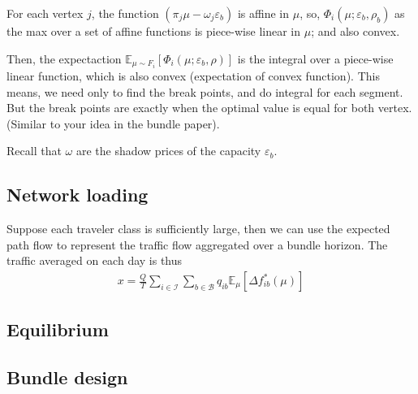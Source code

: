 \documentclass{article}
\newcommand{\setB}{\mathcal{B}}
\newcommand{\setI}{\mathcal{I}}
\newcommand{\jl}[1]{{\color{red}{\noindent JL:#1}}}
\begin{document}
{For each vertex $j$, the function $(\pi_j\mu -\omega_j \varepsilon_b)$ is affine in $\mu$, so, $\Phi_{i}(\mu;\varepsilon_b,\rho_b)$ as the max over a set of affine functions is piece-wise linear in $\mu$; and also convex.

Then, the expectaction $\mathbb E_{\mu\sim F_i}\!\left[\Phi_{i}(\mu;\varepsilon_b,\rho)\right]$ is the integral over a piece-wise linear function, which is also convex (expectation of convex function). This means, we need only to find the break points, and do integral for each segment. But the break points are exactly when the optimal value is equal for both vertex. (Similar to your idea in the bundle paper).

Recall that $\omega$ are the shadow prices of the capacity $\varepsilon_b$.

}
\subsection{Network loading}
Suppose each traveler class is sufficiently large, then we can use the expected path flow to represent the traffic flow aggregated over a bundle horizon. The traffic averaged on each day is thus 
\begin{align}
    x = \frac{Q}{T} \sum_{i\in\setI} \sum_{b\in\setB} q_{ib}\mathbb{E}_\mu[\Delta f^*_{ib}(\mu)]
\end{align}

\jl{
If congestion and mode-specific capacity constraints are considered, a path-based formulation becomes necessary, but the resulting path-flow solution is generally not unique. If link flows are defined as the expectation over a stochastic distribution of such non-unique path flows, are the resulting link flows unique, and how can they be computed?
}

\subsection{Equilibrium}

\jl{Should the goal of this section be a coupled equilibrium definition in its original form, or a further reduced single-object formulation such as a VI/fixed-point representation? What is the minimum level of theoretical properties that needs to be established before moving on to the bundle design problem?
}

\subsection{Bundle design}
\end{document}
